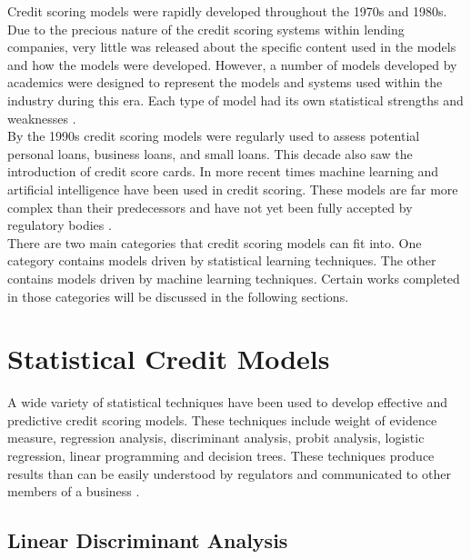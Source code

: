 Credit scoring models were rapidly developed throughout the 1970s and 1980s. Due to the precious nature of the credit scoring systems within lending companies, very little was released about the specific content used in the models and how the models were developed.   However, a number of models developed by academics were designed to represent the models and systems used within the industry during this era. Each type of model had its own statistical strengths and weaknesses \parencite{CreditScoringReadings}. \\

By the 1990s credit scoring models were regularly used to assess potential personal loans, business loans, and small loans. This decade also saw the introduction of credit score cards. In more recent times machine learning and artificial intelligence have been used in credit scoring. These models are far more complex than their predecessors and have not yet been fully accepted by regulatory bodies \parencite{CreditScoringTechniquesOverview}. \\

There are two main categories that credit scoring models can fit into. One category contains models driven by statistical learning techniques. The other contains models driven by machine learning techniques. Certain works completed in those categories will be discussed in the following sections. 


\section{Statistical Credit Models}

A wide variety of statistical techniques have been used to develop effective and predictive credit scoring models. These techniques include weight of evidence measure, regression analysis, discriminant analysis, probit analysis, logistic regression, linear programming and decision trees. These techniques produce results than can be easily understood by regulators and communicated to other members of a business \parencite{CreditScoringTechniquesLitReview}. 

\subsection{Linear Discriminant Analysis}

